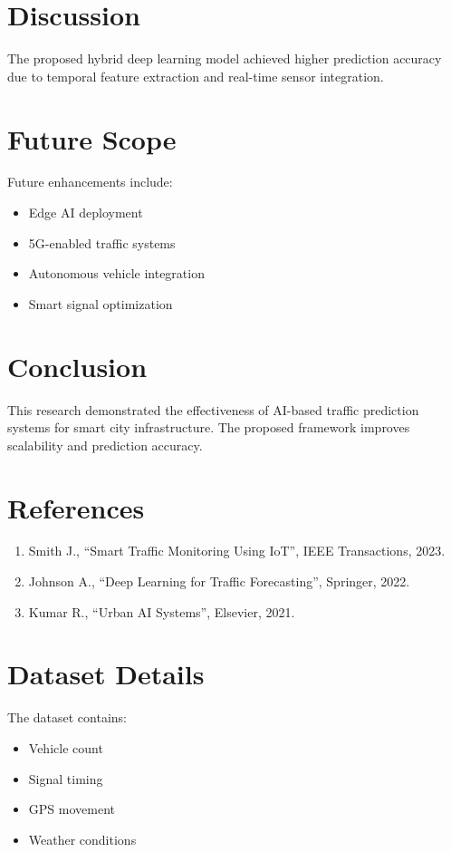 \documentclass[12pt,a4paper]{article}
\begin{document}
	
	\section{Discussion}
	
	The proposed hybrid deep learning model achieved higher prediction accuracy due to temporal feature extraction and real-time sensor integration.
	
	
	\section{Future Scope}
	
	Future enhancements include:
	
	\begin{itemize}
		\item Edge AI deployment
		\item 5G-enabled traffic systems
		\item Autonomous vehicle integration
		\item Smart signal optimization
	\end{itemize}
	
	
	\section{Conclusion}
	
	This research demonstrated the effectiveness of AI-based traffic prediction systems for smart city infrastructure. The proposed framework improves scalability and prediction accuracy.
	
	
	\section*{References}
	
	\begin{enumerate}
		
		\item Smith J., ``Smart Traffic Monitoring Using IoT'', IEEE Transactions, 2023.
		
		\item Johnson A., ``Deep Learning for Traffic Forecasting'', Springer, 2022.
		
		\item Kumar R., ``Urban AI Systems'', Elsevier, 2021.
		
	\end{enumerate}
	
	
	\appendix
	
	\section{Dataset Details}
	
	The dataset contains:
	\begin{itemize}
		\item Vehicle count
		\item Signal timing
		\item GPS movement
		\item Weather conditions
	\end{itemize}
	
\end{document}
